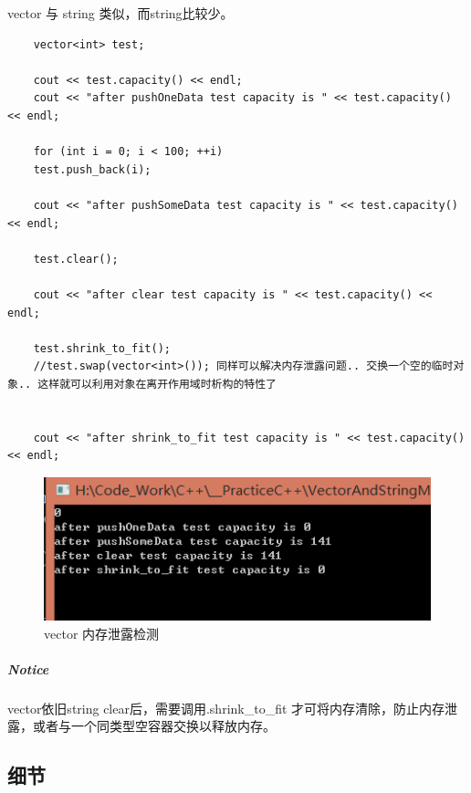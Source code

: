 \documentclass[UTF8,a4paper,12pt]{ctexbook}
\begin{document}
			vector 与 string 类似，而string比较少。
			\begin{lstlisting}
	vector<int> test;
	
	cout << test.capacity() << endl;
	cout << "after pushOneData test capacity is " << test.capacity() << endl;
	
	for (int i = 0; i < 100; ++i)
	test.push_back(i);
	
	cout << "after pushSomeData test capacity is " << test.capacity() << endl;
	
	test.clear();
	
	cout << "after clear test capacity is " << test.capacity() << endl;
	
	test.shrink_to_fit();
	//test.swap(vector<int>()); 同样可以解决内存泄露问题.. 交换一个空的临时对象.. 这样就可以利用对象在离开作用域时析构的特性了
	
	
	cout << "after shrink_to_fit test capacity is " << test.capacity() << endl;
			\end{lstlisting}
	
			\begin{figure}[h]
				\centering
				\includegraphics[scale = 1]{VectorMemoryleak.png}
				\caption{vector 内存泄露检测}
			\end{figure}
			
			\subparagraph{Notice}vector依旧string clear后，需要调用.shrink\_to\_fit 才可将内存清除，防止内存泄露，或者与一个同类型空容器交换以释放内存。
		\subsection{细节}
\end{document}
